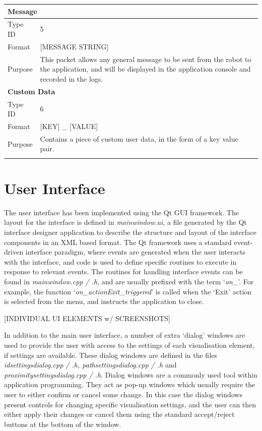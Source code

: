 \begin{longtable}{ l p{12cm} }
 \hline
 \multicolumn{2}{p{12cm}}{\textbf{Message}}\\
 \hline
 Type ID & 5 \\
 Format & [MESSAGE STRING]\\
 Purpose & This packet allows any general message to be sent from the robot to the application, and will be displayed in the application console and recorded in the logs. \\
 
 \hline
 \multicolumn{2}{p{12cm}}{\textbf{Custom Data}}\\
 \hline
 Type ID & 6 \\
 Format & [KEY] \_ [VALUE]\\
 Purpose & Contains a piece of custom user data, in the form of a key value pair. \\
	
 \label{tab:DataFormat}
\end{longtable}


\section{User Interface} \label{UserInterfaceImplementation}
The user interface has been implemented using the Qt GUI framework. The layout for the interface is defined in \textit{mainwindow.ui}, a file generated by the Qt interface designer application to describe the structure and layout of the interface components in an XML based format. The Qt framework uses a standard event-driven interface paradigm, where events are generated when the user interacts with the interface, and code is used to define specific routines to execute in response to relevant events. The routines for handling interface events can be found in \textit{mainwindow.cpp / .h}, and are usually prefixed with the term `\textit{on\_}'. For example, the function `\textit{on\_actionExit\_triggered}' is called when the `Exit' action is selected from the menu, and instructs the application to close.

[INDIVIDUAL UI ELEMENTS w/ SCREENSHOTS]

In addition to the main user interface, a number of extra `dialog' windows are used to provide the user with access to the settings of each visualisation element, if settings are available. These dialog windows are defined in the files  \textit{idsettingsdialog.cpp / .h, pathsettingsdialog.cpp / .h} and \textit{proximitysettingsdialog.cpp / .h}. Dialog windows are a commonly used tool within application programming. They act as pop-up windows which usually require the user to either confirm or cancel some change. In this case the dialog windows present controls for changing specific visualisation settings, and the user can then either apply their changes or cancel them using the standard accept/reject buttons at the bottom of the window.

